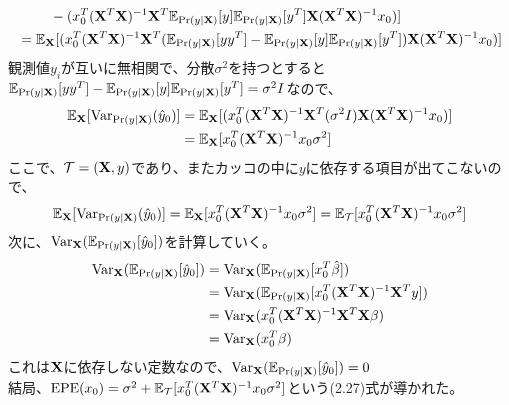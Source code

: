 \documentclass{jsarticle}
\begin{document}
\begin{enumerate}
\begin{align*}
&\ \ \ \ \ \ \ -(x_0^T ({\bf X}^T{\bf X})^{-1}{\bf X}^T\mathbb{E}_{\Pr(y|{\bf X})}[y]\mathbb{E}_{\Pr(y|{\bf X})}[y^T]{\bf X}({\bf X}^T{\bf X})^{-1}x_0)]\\
&=\mathbb{E}_{{\bf X}}[(x_0^T ({\bf X}^T{\bf X})^{-1}{\bf X}^T(\mathbb{E}_{\Pr(y|{\bf X})}[yy^T]-\mathbb{E}_{\Pr(y|{\bf X})}[y]\mathbb{E}_{\Pr(y|{\bf X})}[y^T]){\bf X}({\bf X}^T{\bf X})^{-1}x_0)]
\end{align*}
観測値$y_i$が互いに無相関で、分散$\sigma^2$を持つとすると$\mathbb{E}_{\Pr(y|{\bf X})}[yy^T]-\mathbb{E}_{\Pr(y|{\bf X})}[y]\mathbb{E}_{\Pr(y|{\bf X})}[y^T]=\sigma^2 I$なので、
\begin{align*}
\mathbb{E}_{{\bf X}}[{\rm Var}_{\Pr(y|{\bf X})}(\hat{y}_0)]&=\mathbb{E}_{{\bf X}}[(x_0^T ({\bf X}^T{\bf X})^{-1}{\bf X}^T(\sigma^2 I){\bf X}({\bf X}^T{\bf X})^{-1}x_0)]\\
&=\mathbb{E}_{{\bf X}}[x_0^T ({\bf X}^T{\bf X})^{-1}x_0\sigma^2]
\end{align*}
ここで、${\cal T}=({\bf X},y)$であり、またカッコの中に$y$に依存する項目が出てこないので、
\[\mathbb{E}_{{\bf X}}[{\rm Var}_{\Pr(y|{\bf X})}(\hat{y}_0)]=\mathbb{E}_{{\bf X}}[x_0^T ({\bf X}^T{\bf X})^{-1}x_0\sigma^2]=\mathbb{E}_{\cal T}[x_0^T ({\bf X}^T{\bf X})^{-1}x_0\sigma^2]\]
次に、${\rm Var}_{{\bf X}}(\mathbb{E}_{\Pr(y|{\bf X})}[\hat{y}_0])$を計算していく。
\begin{align*}
{\rm Var}_{{\bf X}}(\mathbb{E}_{\Pr(y|{\bf X})}[\hat{y}_0])&={\rm Var}_{{\bf X}}(\mathbb{E}_{\Pr(y|{\bf X})}[x_0^T\hat{\beta}])\\
&={\rm Var}_{{\bf X}}(\mathbb{E}_{\Pr(y|{\bf X})}[x_0^T({\bf X}^T{\bf X})^{-1}{\bf X}^Ty])\\
&={\rm Var}_{{\bf X}}(x_0^T({\bf X}^T{\bf X})^{-1}{\bf X}^T{\bf X}\beta)\\
&={\rm Var}_{{\bf X}}(x_0^T\beta)
\end{align*}
これは${\bf X}$に依存しない定数なので、${\rm Var}_{{\bf X}}(\mathbb{E}_{\Pr(y|{\bf X})}[\hat{y}_0])=0$
\\
結局、${\rm EPE}(x_0)=\sigma^2+\mathbb{E}_{\cal T}[x_0^T ({\bf X}^T{\bf X})^{-1}x_0\sigma^2]$という(2.27)式が導かれた。





\end{enumerate}
\end{document}
